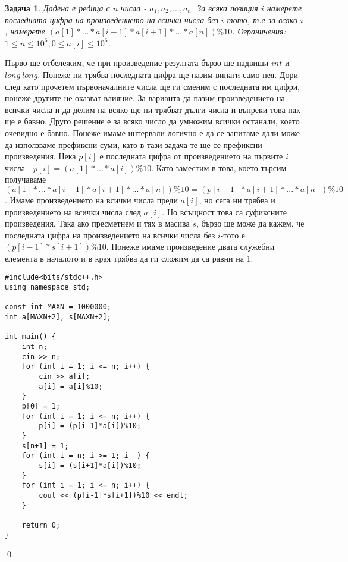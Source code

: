 \documentclass[]{article}
\newtheorem{problem}{Задача}
\newenvironment{solution}{\noindent{\bf Решение.}\hspace*{1em}}{\qed\par}
\begin{document}
\begin{problem}
Дадена е редица с $n$ числа - $a_1,a_2,...,a_n$. За всяка позиция $i$ намерете последната цифра на произведението на всички числа без $i$-тото, т.е за всяко $i$, намерете $(a[1]*...*a[i-1]*a[i+1]*...*a[n])\%10$.\newline
Ограничения: $1\leq n\leq 10^6,0 \leq a[i]\leq 10^6$.
\end{problem}
\begin{solution}
Първо ще отбележим, че при произведение резултата бързо ще надвиши $int$ и $long\ long$. Понеже ни трябва последната цифра ще пазим винаги само нея. Дори след като прочетем първоначалните числа ще ги сменим с последната им цифри, понеже другите не оказват влияние.\newline
За варианта да пазим произведението на всички числа и да делим на всяко ще ни трябват дълги числа и въпреки това пак ще е бавно.\newline
Друго решение е за всяко число да умножим всички останали, което очевидно е бавно.\newline
Понеже имаме интервали логично е да се запитаме дали може да използваме префиксни суми, като в тази задача те ще се префиксни произведения. Нека $p[i]$ е последната цифра от произведението на първите $i$ числа - $p[i]=(a[1]*...*a[i])\%10$. Като заместим в това, което търсим получаваме $(a[1]*...*a[i-1]*a[i+1]*...*a[n])\%10=(p[i-1]*a[i+1]*...*a[n])\%10$. Имаме произведението на всички числа преди $a[i]$, но сега ни трябва и произведението на всички числа след $a[i]$. Но всъщност това са суфиксните произведения. Така ако пресметнем и тях в масива $s$, бързо ще може да кажем, че последната цифра на произведението на всички числа без $i$-тото е $(p[i-1]*s[i+1])\%10$.\newline
Понеже имаме произведение двата служебни елемента в началото и в края трябва да ги сложим да са равни на 1.
\begin{verbatim}
#include<bits/stdc++.h>
using namespace std;

const int MAXN = 1000000;
int a[MAXN+2], s[MAXN+2];

int main() {
    int n;
    cin >> n;
    for (int i = 1; i <= n; i++) {
        cin >> a[i];
        a[i] = a[i]%10;
    }
    p[0] = 1;
    for (int i = 1; i <= n; i++) {
        p[i] = (p[i-1]*a[i])%10;
    }
    s[n+1] = 1;
    for (int i = n; i >= 1; i--) {
        s[i] = (s[i+1]*a[i])%10;
    }
    for (int i = 1; i <= n; i++) {
        cout << (p[i-1]*s[i+1])%10 << endl;
    }

    return 0;
}
\end{verbatim}
\end{solution}
\end{document}
